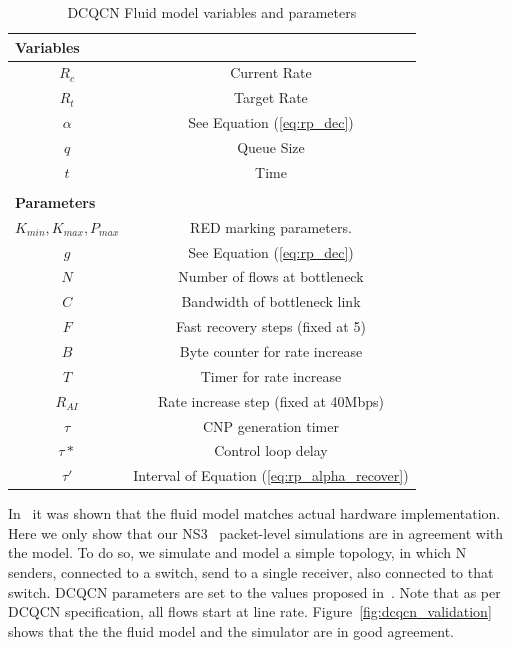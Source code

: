 \begin{table}
\center
{
\footnotesize
{
\begin{tabular}{|c|c|}
\multicolumn{2}{l}{\bf Variables} \\ \hline
$R_c$ & Current Rate \\ \hline
$R_t$ & Target Rate \\ \hline
$\alpha$ & See Equation (\ref{eq:rp_dec}) \\ \hline
$q$ & Queue Size \\ \hline
$t$ & Time \\ \hline
\multicolumn{2}{c}{} \\
\multicolumn{2}{l}{\bf Parameters} \\ \hline
$K_{min}, K_{max}, P_{max}$ & RED marking parameters. \\ \hline
$g$ & See Equation (\ref{eq:rp_dec}) \\ \hline
$N$ & Number of flows at bottleneck\\ \hline
$C$ & Bandwidth of bottleneck link\\ \hline
$F$ & Fast recovery steps (fixed at 5) \\ \hline
$B$ & Byte counter for rate increase\\ \hline
$T$ & Timer for rate increase\\ \hline
$R_{AI}$ & Rate increase step (fixed at 40Mbps)\\ \hline
$\tau$ & CNP generation timer \\ \hline
$\tau *$ & Control loop delay \\ \hline
$\tau '$ & Interval of Equation (\ref{eq:rp_alpha_recover})\\ \hline
\end{tabular}
}
}
\caption{DCQCN Fluid model variables and parameters}
\vspace{-0.5em}
\label{tab:dcqcn_varparam}
\end{table}

In~\cite{dcqcn} it was shown that the fluid model matches actual hardware
implementation. Here we only show that our NS3~\cite{ns3} packet-level
simulations are in agreement with the model.  To do so, we simulate and model a
simple topology, in which N senders, connected to a switch, send to a single
receiver, also connected to that switch. DCQCN parameters are set to the values
proposed in~\cite{dcqcn}. Note that as per DCQCN specification, all flows start
at line rate. Figure~\ref{fig:dcqcn_validation} shows that the the fluid model
and the simulator are in good agreement.

